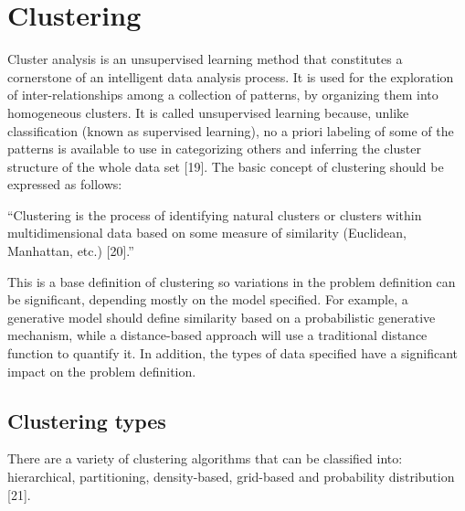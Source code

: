 \documentclass[
]{article}
\begin{document}
\hypertarget{clustering}{%
\section{\texorpdfstring{Clustering
\label{sec:clustering}}{Clustering }}\label{clustering}}

Cluster analysis is an unsupervised learning method that constitutes a
cornerstone of an intelligent data analysis process. It is used for the
exploration of inter-relationships among a collection of patterns, by
organizing them into homogeneous clusters. It is called unsupervised
learning because, unlike classification (known as supervised learning),
no a priori labeling of some of the patterns is available to use in
categorizing others and inferring the cluster structure of the whole
data set {[}19{]}. The basic concept of clustering should be expressed
as follows:

``Clustering is the process of identifying natural clusters or clusters
within multidimensional data based on some measure of similarity
(Euclidean, Manhattan, etc.) {[}20{]}.''

This is a base definition of clustering so variations in the problem
definition can be significant, depending mostly on the model specified.
For example, a generative model should define similarity based on a
probabilistic generative mechanism, while a distance-based approach will
use a traditional distance function to quantify it. In addition, the
types of data specified have a significant impact on the problem
definition.

\hypertarget{clustering-types}{%
\subsection{Clustering types}\label{clustering-types}}

There are a variety of clustering algorithms that can be classified
into: hierarchical, partitioning, density-based, grid-based and
probability distribution {[}21{]}.
\end{document}
